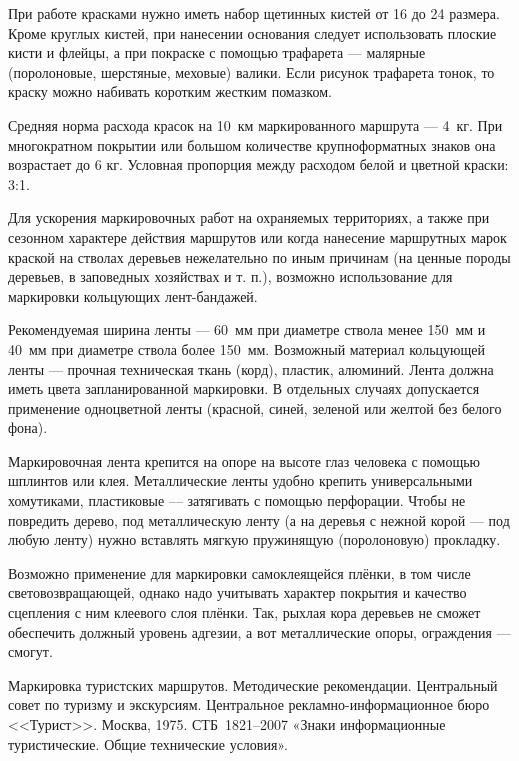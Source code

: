 \documentclass[a4paper,12pt]{extarticle}
\begin{document}
При работе красками нужно иметь набор щетинных кистей от 16 до 24 размера. Кроме круглых кистей, при нанесении основания
следует использовать плоские кисти и флейцы, а при покраске с помощью трафарета --- малярные (поролоновые, шерстяные,
меховые) валики. Если рисунок трафарета тонок, то краску можно набивать коротким жестким помазком.

Средняя норма расхода красок на 10~км маркированного маршрута --- 4~кг. При многократном покрытии или большом количестве
крупноформатных знаков она возрастает до 6 кг. Условная пропорция между расходом белой и цветной краски: 3:1.

Для ускорения маркировочных работ на охраняемых территориях, а также при сезонном характере действия маршрутов или когда
нанесение маршрутных марок краской на стволах деревьев нежелательно по иным причинам (на ценные породы деревьев, в
заповедных хозяйствах и т. п.), возможно использование для маркировки кольцующих лент-бандажей.

Рекомендуемая ширина ленты --- 60~мм при диаметре ствола менее 150~мм и 40~мм при диаметре ствола более 150~мм. Возможный
материал кольцующей ленты --- прочная техническая ткань (корд), пластик, алюминий. Лента должна иметь цвета
запланированной маркировки. В отдельных случаях допускается применение одноцветной ленты (красной, синей, зеленой или
желтой без белого фона).

Маркировочная лента крепится на опоре на высоте глаз человека с помощью шплинтов или клея. Металлические ленты удобно
крепить универсальными хомутиками, пластиковые --- затягивать с помощью перфорации. Чтобы не
повредить дерево, под металлическую ленту (а на деревья с нежной корой --- под любую ленту) нужно вставлять мягкую
пружинящую (поролоновую) прокладку.

Возможно применение для маркировки самоклеящейся плёнки, в том числе световозвращающей, однако надо учитывать характер
покрытия и качество сцепления с ним клеевого слоя плёнки. Так, рыхлая кора деревьев не сможет обеспечить должный
уровень адгезии, а вот металлические опоры, ограждения --- смогут.


\begin{thebibliography}{99}
	 Маркировка туристских маршрутов. Методические рекомендации. Центральный совет по туризму и
		экскурсиям. Центральное рекламно-информационное бюро <<Турист>>. Москва, 1975.
	 СТБ~1821--2007 «Знаки информационные туристические. Общие технические условия».
\end{thebibliography}
\end{document}
